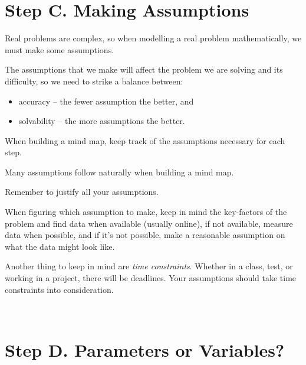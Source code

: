 \section*{Step C. Making Assumptions}\label{C-assumption}






Real problems are complex, so when modelling a real problem mathematically, we must make some assumptions. 

The assumptions that we make will affect the problem we are solving and its difficulty, so we need to strike a balance between:
\begin{itemize}
\item accuracy -- the fewer assumption the better, and
\item solvability -- the more assumptions the better.
\end{itemize}

\begin{annotation}
	\begin{goals}
		When building a mind map, keep track of the assumptions necessary for each step.
	\end{goals}
\end{annotation}

Many assumptions follow naturally when building a mind map. \\


\begin{annotation}
	\begin{goals}
		Remember to justify all your assumptions.
	\end{goals}
\end{annotation}
When figuring which assumption to make, keep in mind the key-factors of the problem and find data when available (usually online), if not available, measure data when possible, and if it's not possible, make a reasonable assumption on what the data might look like.

Another thing to keep in mind are \emph{time constraints}. Whether in a class, test, or working in a project, there will be deadlines. Your assumptions should take time constraints into consideration. 

\hfill \\

\section*{Step D. Parameters or Variables?}\label{D-parvsvar}


